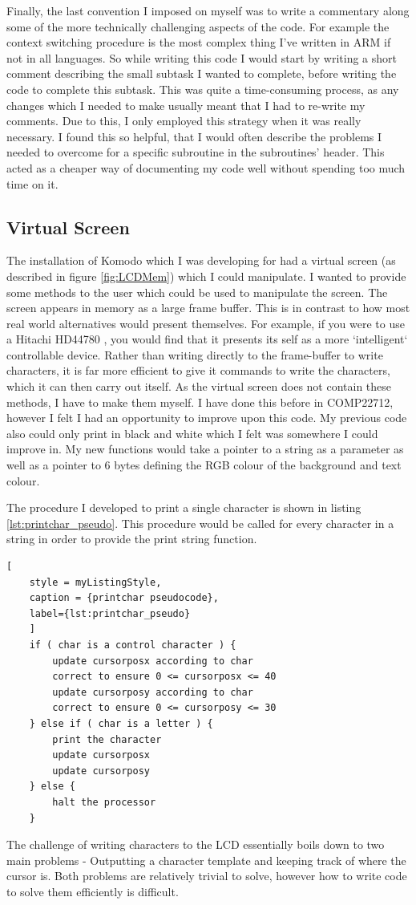 Finally, the last convention I imposed on myself was to write a commentary along some of the more technically challenging aspects of the code. For example the context switching procedure is the most complex thing I've written in ARM if not in all languages. So while writing this code I would start by writing a short comment describing the small subtask I wanted to complete, before  writing the code to complete this subtask. This was quite a time-consuming process, as any changes which I needed to make usually meant that I had to re-write my comments. Due to this, I only employed this strategy when it was really necessary. I found this so helpful, that I would often describe the problems I needed to overcome for a specific subroutine in the subroutines' header. This acted as a cheaper way of documenting my code well without spending too much time on it. 
\subsection{Virtual Screen}
The installation of Komodo which I was developing for had a virtual screen (as described in figure \ref{fig:LCDMem}) which I could manipulate. I wanted to provide some methods to the user which could be used to manipulate the screen. The screen appears in memory as a large frame buffer. This is in contrast to how most real world alternatives would present themselves. For example, if you were to use a Hitachi HD44780 \cite{datasheet}, you would find that it presents its self as a more `intelligent` controllable device. Rather than writing directly to the frame-buffer to write characters, it is far more efficient to give it commands to write the characters, which it can then carry out itself. As the virtual screen does not contain these methods, I have to make them myself. I have done this before in COMP22712, however I felt I had an opportunity to improve upon this code. My previous code also could only print in black and white which I felt was somewhere I could improve in. My new functions would take a pointer to a string as a parameter as well as a pointer to 6 bytes defining the RGB colour of the background and text colour. 


The procedure I developed to print a single character is shown in listing \ref{lst:printchar_pseudo}. This procedure would be called for every character in a string in order to provide the print string function. 
\begin{lstlisting}[
	style = myListingStyle,
	caption = {printchar pseudocode},
	label={lst:printchar_pseudo}	
	]
	if ( char is a control character ) {	
		update cursorposx according to char
		correct to ensure 0 <= cursorposx <= 40
		update cursorposy according to char
		correct to ensure 0 <= cursorposy <= 30
	} else if ( char is a letter ) {
		print the character
		update cursorposx
		update cursorposy
	} else {
		halt the processor
	}
\end{lstlisting}
The challenge of writing characters to the LCD essentially boils down to two main problems - Outputting a character template and keeping track of where the cursor is. Both problems are relatively trivial to solve, however how to write code to solve them efficiently is difficult.
